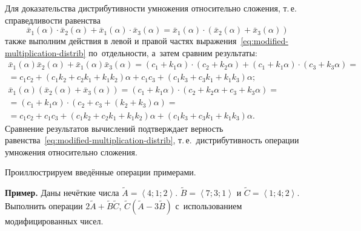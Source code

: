 Для доказательства дистрибутивности умножения относительно сложения, т.\,е. справедливости равенства 
\begin{equation}
\label{eq:modified-multiplication-distrib}
  \bar{x}_1\left(\alpha \right)\cdot \bar{x}_2\left(\alpha \right)+\bar{x}_1\left(\alpha \right)\cdot \bar{x}_3\left(\alpha \right)=\bar{x}_1\left(\alpha \right)\cdot \left(\bar{x}_2(\alpha )+\bar{x}_3(\alpha ) \right)
\end{equation}
также выполним действия в левой и правой частях выражения~\eqref{eq:modified-multiplication-distrib} по~отдельности, а~затем сравним результаты: \allowbreak
\begin{gather*}
  \bar{x}_1\left( \alpha \right)\bar{x}_2\left( \alpha  \right)+\bar{x}_1\left( \alpha  \right)\bar{x}_3\left( \alpha  \right)=(c_1+k_1\alpha )\cdot (c_2+k_2\alpha )+(c_1+k_1\alpha )\cdot (c_3+k_3\alpha )={}\\ 
  {}=c_1c_2+(c_1k_2+c_2k_1+k_1k_2)\alpha +c_1c_3+(c_1k_3+c_3k_1+k_1k_3)\alpha; \\ 
  \bar{x}_1\left( \alpha  \right)\left( \bar{x}_2\left( \alpha  \right)+\bar{x}_3\left( \alpha  \right) \right)=(c_1+k_1\alpha )\cdot (c_2+k_2\alpha +c_3+k_3\alpha )= \\ 
  =\left(c_1+k_1\alpha \right)\cdot \left(c_2+c_3+\left(k_2+k_3\right)\alpha \right)={}\\ 
  {}=c_1c_2+c_1c_3+\left(c_1k_2+c_2k_1+k_1k_2\right)\alpha +\left(c_1k_3+c_3k_1+k_1k_3\right)\alpha.  
\end{gather*}
Сравнение результатов вычислений подтверждает верность равенства~\eqref{eq:modified-multiplication-distrib}, т.\,е.~дистрибутивность операции умножения относительно сложения.

Проиллюстрируем введённые операции примерами.

\textbf{Пример.} Даны нечёткие числа $\tilde{A}=\left\langle 4;1;2 \right\rangle $. $\tilde{B}=\left\langle 7;3;1 \right\rangle $ и $\tilde{C}=\left\langle 1;4;2 \right\rangle $. Выполнить операции $2\tilde{A}+\tilde{B}\tilde{C}$, $\tilde{C}\left( \tilde{A}-3\tilde{B} \right)$ с~использованием модифицированных чисел.

